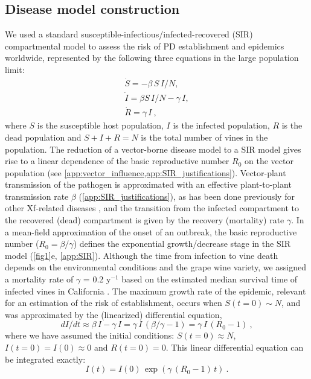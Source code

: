 \subsection{Disease model construction}

We used a standard susceptible-infectious/infected-recovered (SIR)
compartmental model to assess the risk of PD establishment and epidemics
worldwide, represented by the following three equations in the large population
limit:
\begin{equation}
    \begin{array}{l}
        \dot{S}=-\beta \, S \, I/N ,         \\
        \dot{I}=\beta S\, I/N - \gamma\,  I, \\
        \dot{R}=\gamma \, I \ ,
    \end{array}
    \label{eq:SIRmodel}
\end{equation}
where $S$ is the susceptible host population, $I$ is the infected
population, $R$ is the dead population and $S+I+R=N$ is the total number of
vines in the population. The reduction of a vector-borne disease model to a
SIR model gives rise to a linear dependence of the basic reproductive number
$R_0$ on the vector population (see
\cref{app:vector_influence,app:SIR_justifications}).
Vector-plant transmission of the pathogen is approximated with an effective
plant-to-plant transmission rate $\beta$ (\cref{app:SIR_justifications}), as
has been done previously for other Xf-related diseases \cite{White2020}, and
the transition from the infected compartment to the recovered (dead)
compartment is given by the recovery (mortality) rate $\gamma$.  In a
mean-field approximation of the onset of an outbreak, the basic reproductive
number ($R_0=\beta/\gamma$) defines the exponential growth/decrease stage in
the SIR model (\cref{fig1}e, \cref{app:SIR}). Although the time from infection
to vine death depends on the environmental conditions and the grape wine
variety, we assigned a mortality rate of $\gamma$ = 0.2 y$^{-1}$  based on the
estimated median survival time of infected vines in California
\cite{Almeida2003}. The maximum growth rate of the epidemic, relevant for an
estimation of the risk of establishment, occurs when $S(t=0)\sim N$, and was
approximated by the (linearized) differential equation,
\begin{equation}
    dI/dt \approx \beta \, I-\gamma \, I = \gamma\,  I\, (\beta/\gamma -
    1)=\gamma \, I\, (R_0-1) \ ,
\end{equation}
where we have assumed the initial conditions:
$S(t= 0)\approx N$, $I(t = 0)= I(0) \approx0$ and $R(t = 0)=0$. This linear
differential equation can be integrated exactly:
\begin{equation}\label{eq:infect_proc}
    I(t)=I(0)\, \exp(\gamma\, (R_0-1)\, t) \ .
\end{equation}

